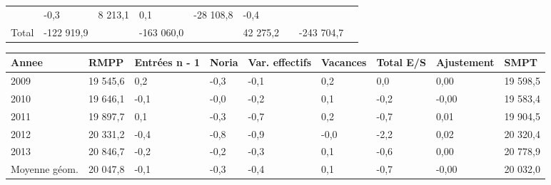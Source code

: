 \begin{longtable}[]{@{}lllllllll@{}}
\begin{minipage}[t]{0.16\columnwidth}
\end{minipage} & \begin{minipage}[t]{0.06\columnwidth}\raggedright
-0,3\strut
\end{minipage} & \begin{minipage}[t]{0.12\columnwidth}\raggedright
8 213,1\strut
\end{minipage} & \begin{minipage}[t]{0.06\columnwidth}\raggedright
0,1\strut
\end{minipage} & \begin{minipage}[t]{0.09\columnwidth}\raggedright
-28 108,8\strut
\end{minipage} & \begin{minipage}[t]{0.06\columnwidth}\raggedright
-0,4\strut
\end{minipage}\tabularnewline
\begin{minipage}[t]{0.05\columnwidth}\raggedright
Total\strut
\end{minipage} & \begin{minipage}[t]{0.10\columnwidth}\raggedright
-122 919,9\strut
\end{minipage} & \begin{minipage}[t]{0.06\columnwidth}\raggedright
\strut
\end{minipage} & \begin{minipage}[t]{0.16\columnwidth}\raggedright
-163 060,0\strut
\end{minipage} & \begin{minipage}[t]{0.06\columnwidth}\raggedright
\strut
\end{minipage} & \begin{minipage}[t]{0.12\columnwidth}\raggedright
42 275,2\strut
\end{minipage} & \begin{minipage}[t]{0.06\columnwidth}\raggedright
\strut
\end{minipage} & \begin{minipage}[t]{0.09\columnwidth}\raggedright
-243 704,7\strut
\end{minipage} & \begin{minipage}[t]{0.06\columnwidth}\raggedright
\strut
\end{minipage}\tabularnewline
\bottomrule
\end{longtable}

\begin{longtable}[]{@{}lllllllll@{}}
\toprule
Annee & RMPP & Entrées n - 1 & Noria & Var. effectifs & Vacances & Total
E/S & Ajustement & SMPT\tabularnewline
\midrule
\endhead
2009 & 19 545,6 & 0,2 & -0,3 & -0,1 & 0,2 & 0,0 & 0,00 & 19
598,5\tabularnewline
2010 & 19 646,1 & -0,1 & -0,0 & -0,2 & 0,1 & -0,2 & -0,00 & 19
583,4\tabularnewline
2011 & 19 897,7 & 0,1 & -0,3 & -0,7 & 0,2 & -0,7 & 0,01 & 19
904,5\tabularnewline
2012 & 20 331,2 & -0,4 & -0,8 & -0,9 & -0,0 & -2,2 & 0,02 & 20
320,4\tabularnewline
2013 & 20 846,7 & -0,2 & -0,2 & -0,3 & 0,1 & -0,6 & 0,00 & 20
778,9\tabularnewline
Moyenne géom. & 20 047,8 & -0,1 & -0,3 & -0,4 & 0,1 & -0,7 & -0,00 & 20
032,0\tabularnewline
\bottomrule
\end{longtable}

